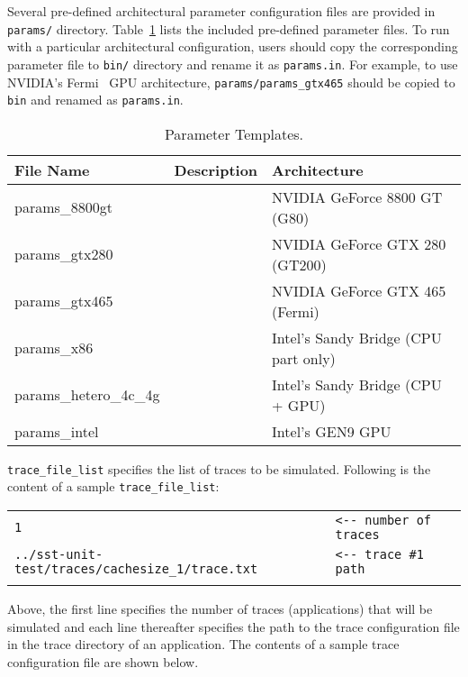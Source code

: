 Several pre-defined architectural parameter configuration files are provided in
\Verb+params/+ directory. Table~\ref{table:param} lists the included
pre-defined parameter files. To run \SIM with a particular architectural
configuration, users should copy the corresponding parameter file to \Verb+bin/+
directory and rename it as \Verb+params.in+. For example, to use NVIDIA's
Fermi~\cite{fermi} GPU architecture, \Verb+params/params_gtx465+ should be
copied to \Verb+bin+ and renamed as \Verb+params.in+. 

\begin{table}[!h]
\begin{footnotesize}
\begin{center}
\caption{Parameter Templates.}
\label{table:param}
\begin{tabular}{|l|l|l|}
\hline
File Name              & Description & Architecture                         \\ \hline \hline
params\_8800gt         &             & NVIDIA GeForce 8800 GT (G80)         \\
params\_gtx280         &             & NVIDIA GeForce GTX 280 (GT200)       \\
params\_gtx465         &             & NVIDIA GeForce GTX 465 (Fermi)       \\
params\_x86            &             & Intel's Sandy Bridge (CPU part only) \\
params\_hetero\_4c\_4g &             & Intel's Sandy Bridge (CPU + GPU)     \\
params\_intel          &             & Intel's GEN9 GPU                     \\ \hline
\end{tabular}
\end{center}
\end{footnotesize}
\end{table}


\noindent \Verb+trace_file_list+ specifies the list of traces to be simulated. Following is the
content of a sample \Verb+trace_file_list+: \\

\begin{tabular}[!h]{l l}
 \Verb+1+	& \Verb+<-- number of traces+ \\
 \Verb+../sst-unit-test/traces/cachesize_1/trace.txt+ & \Verb+<-- trace #1 path+ \\
 & \\
\end{tabular}


\noindent 	Above, the first line specifies the number of traces (applications) that will
be simulated and each line thereafter specifies the path to the trace
configuration file in the trace directory of an application. The contents of a
sample trace configuration file are shown below.


